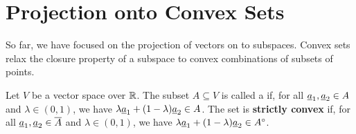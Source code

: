 \section{Projection onto Convex Sets}

So far, we have focused on the projection of vectors on to subspaces.
Convex sets relax the closure property of a subspace to convex combinations of subsets of points.

\begin{definition}
Let $V$ be a vector space over $\mathbb{R}$.
The subset $A \subseteq V$ is called a  if, for all $\underline{a}_1,\underline{a}_2 \in A$ and $\lambda\in(0,1)$, we have $\lambda \underline{a}_1 + (1-\lambda) \underline{a}_2 \in A$.
The set is \textbf{strictly convex} if, for all $\underline{a}_1,\underline{a}_2 \in \overline{A}$ and $\lambda\in(0,1)$, we have $\lambda \underline{a}_1 + (1-\lambda) \underline{a}_2 \in {A}^{\circ}$.
\end{definition}

